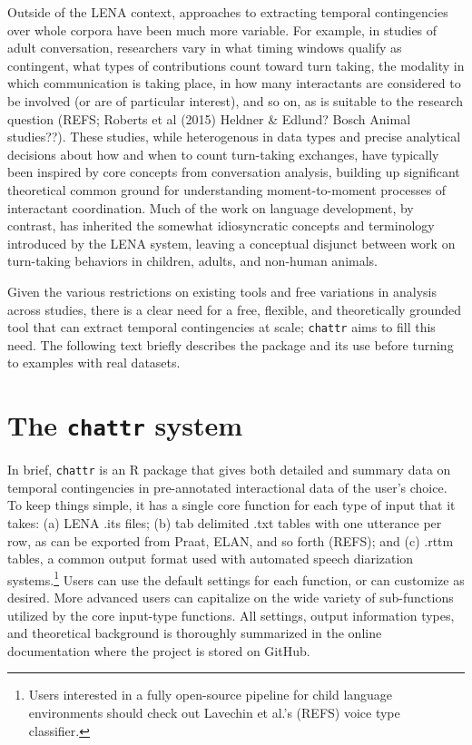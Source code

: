 \documentclass[10pt, letterpaper]{article}
\begin{document}
Outside of the LENA context, approaches to extracting temporal
contingencies over whole corpora have been much more variable. For
example, in studies of adult conversation, researchers vary in what
timing windows qualify as contingent, what types of contributions count
toward turn taking, the modality in which communication is taking place,
in how many interactants are considered to be involved (or are of
particular interest), and so on, as is suitable to the research question
(REFS; Roberts et al (2015) Heldner \& Edlund? Bosch Animal studies??).
These studies, while heterogenous in data types and precise analytical
decisions about how and when to count turn-taking exchanges, have
typically been inspired by core concepts from conversation analysis,
building up significant theoretical common ground for understanding
moment-to-moment processes of interactant coordination. Much of the work
on language development, by contrast, has inherited the somewhat
idiosyncratic concepts and terminology introduced by the LENA system,
leaving a conceptual disjunct between work on turn-taking behaviors in
children, adults, and non-human animals.

Given the various restrictions on existing tools and free variations in
analysis across studies, there is a clear need for a free, flexible, and
theoretically grounded tool that can extract temporal contingencies at
scale; \texttt{chattr} aims to fill this need. The following text
briefly describes the package and its use before turning to examples
with real datasets.

\hypertarget{the-chattr-system}{%
\section{\texorpdfstring{The \texttt{chattr}
system}{The chattr system}}\label{the-chattr-system}}

In brief, \texttt{chattr} is an R package that gives both detailed and
summary data on temporal contingencies in pre-annotated interactional
data of the user's choice. To keep things simple, it has a single core
function for each type of input that it takes: (a) LENA .its files; (b)
tab delimited .txt tables with one utterance per row, as can be exported
from Praat, ELAN, and so forth (REFS); and (c) .rttm tables, a common
output format used with automated speech diarization systems.\footnote{Users
  interested in a fully open-source pipeline for child language
  environments should check out Lavechin et al.'s (REFS) voice type
  classifier.} Users can use the default settings for each function, or
can customize as desired. More advanced users can capitalize on the wide
variety of sub-functions utilized by the core input-type functions. All
settings, output information types, and theoretical background is
thoroughly summarized in the online documentation where the project is
stored on GitHub.
\end{document}
